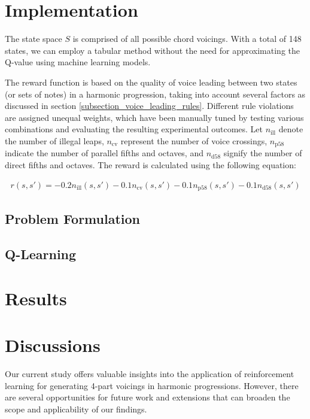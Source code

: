 \documentclass[12pt, letterpaper]{article}
\begin{document}
\section{Implementation}

The state space $S$ is comprised of all possible chord voicings. With a total of 148 states, we can employ a tabular method without the need for approximating the Q-value using machine learning models.

The reward function is based on the quality of voice leading between two states (or sets of notes) in a harmonic progression, taking into account several factors as discussed in section \ref{subsection_voice_leading_rules}. Different rule violations are assigned unequal weights, which have been manually tuned by testing various combinations and evaluating the resulting experimental outcomes. Let $n_\text{ill}$ denote the number of illegal leaps, $n_\text{cv}$ represent the number of voice crossings, $n_\text{p58}$ indicate the number of parallel fifths and octaves, and $n_\text{d58}$ signify the number of direct fifths and octaves. The reward is calculated using the following equation:

\begin{align}
    r(s, s') = -0.2n_\text{ill}(s, s') - 0.1n_\text{cv}(s, s') - 0.1n_\text{p58}(s, s') -0.1n_\text{d58}(s, s')
\end{align}



\subsection{Problem Formulation}

\subsection{Q-Learning}

\section{Results}

\section{Discussions}

Our current study offers valuable insights into the application of reinforcement learning for generating 4-part voicings in harmonic progressions. However, there are several opportunities for future work and extensions that can broaden the scope and applicability of our findings.
\end{document}
